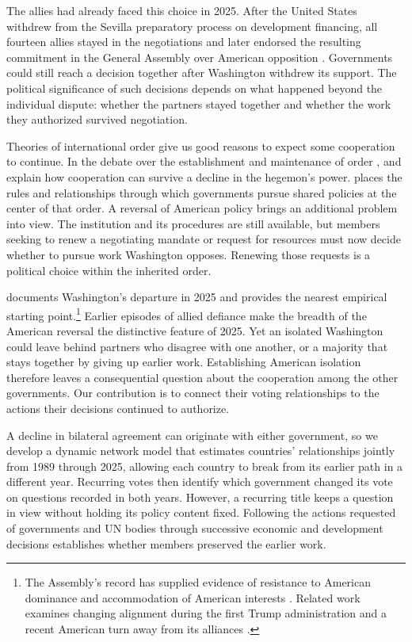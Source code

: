 \documentclass[12pt,authoryear]{elsarticle}
\begin{document}
The allies had already faced this choice in 2025. After the United States withdrew from the Sevilla preparatory process on development financing, all fourteen allies stayed in the negotiations and later endorsed the resulting commitment in the General Assembly over American opposition \citep{usun:2025:ffd4withdrawal,un:2025:sevillavote}. Governments could still reach a decision together after Washington withdrew its support. The political significance of such decisions depends on what happened beyond the individual dispute: whether the partners stayed together and whether the work they authorized survived negotiation.

Theories of international order give us good reasons to expect some cooperation to continue. In the debate over the establishment and maintenance of order \citep{gilpin:1981}, \citet{keohane:1984} and \citet{snidal:1985} explain how cooperation can survive a decline in the hegemon's power. \citet{ikenberry:2001,ikenberry:2011} places the rules and relationships through which governments pursue shared policies at the center of that order. A reversal of American policy brings an additional problem into view. The institution and its procedures are still available, but members seeking to renew a negotiating mandate or request for resources must now decide whether to pursue work Washington opposes. Renewing those requests is a political choice within the inherited order.

\citet{voeten:2026:usdeparture} documents Washington's departure in 2025 and provides the nearest empirical starting point.\footnote{The Assembly's record has supplied evidence of resistance to American dominance \citep{voeten2004resisting} and accommodation of American interests \citep{kegley:hook:1991,carter:stone:2015}. Related work examines changing alignment during the first Trump administration \citep{mosler:potrafke:2020} and a recent American turn away from its alliances \citep{carson:metz:poast:2025}.} Earlier episodes of allied defiance make the breadth of the American reversal the distinctive feature of 2025. Yet an isolated Washington could leave behind partners who disagree with one another, or a majority that stays together by giving up earlier work. Establishing American isolation therefore leaves a consequential question about the cooperation among the other governments. Our contribution is to connect their voting relationships to the actions their decisions continued to authorize.

A decline in bilateral agreement can originate with either government, so we develop a dynamic network model that estimates countries' relationships jointly from 1989 through 2025, allowing each country to break from its earlier path in a different year. Recurring votes then identify which government changed its vote on questions recorded in both years. However, a recurring title keeps a question in view without holding its policy content fixed. Following the actions requested of governments and UN bodies through successive economic and development decisions establishes whether members preserved the earlier work. 
\end{document}
